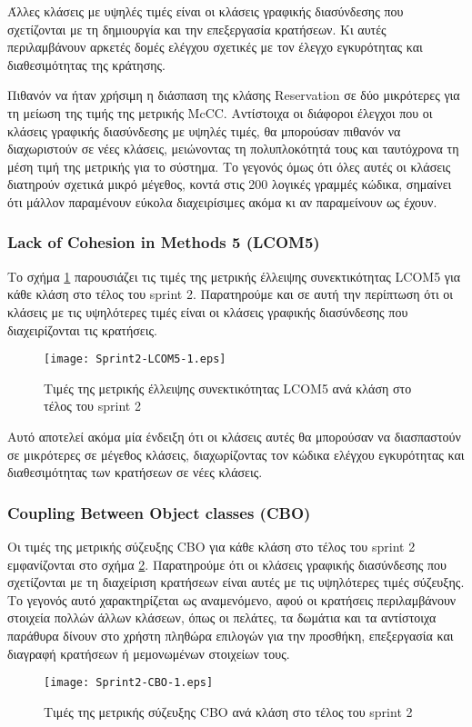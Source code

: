Άλλες κλάσεις με υψηλές τιμές είναι οι κλάσεις γραφικής διασύνδεσης που
σχετίζονται με τη δημιουργία και την επεξεργασία κρατήσεων. Κι αυτές
περιλαμβάνουν αρκετές δομές ελέγχου σχετικές με τον έλεγχο εγκυρότητας
και διαθεσιμότητας της κράτησης.

Πιθανόν να ήταν χρήσιμη η διάσπαση της κλάσης Reservation σε δύο
μικρότερες
για τη μείωση της τιμής της μετρικής McCC. Αντίστοιχα οι διάφοροι
έλεγχοι που οι κλάσεις γραφικής διασύνδεσης με υψηλές τιμές, θα
μπορούσαν πιθανόν να διαχωριστούν σε νέες κλάσεις, μειώνοντας τη
πολυπλοκότητά τους και ταυτόχρονα τη μέση τιμή της μετρικής για το
σύστημα. Το γεγονός όμως ότι όλες αυτές οι κλάσεις διατηρούν σχετικά
μικρό μέγεθος, κοντά στις 200 λογικές γραμμές κώδικα, σημαίνει ότι
μάλλον παραμένουν εύκολα διαχειρίσιμες ακόμα κι αν παραμείνουν ως έχουν.

\subsubsection{Lack of Cohesion in Methods 5 (LCOM5)}
\label{section:sprint2LCOM5}

Το σχήμα \ref{fig:sprint2LCOM5} παρουσιάζει τις τιμές της μετρικής
έλλειψης συνεκτικότητας LCOM5 για κάθε κλάση στο τέλος του sprint 2.
Παρατηρούμε και σε αυτή την περίπτωση ότι οι κλάσεις με τις υψηλότερες
τιμές είναι οι κλάσεις γραφικής διασύνδεσης που διαχειρίζονται τις
κρατήσεις.

\begin{figure}
\centering
\texttt{[image: Sprint2-LCOM5-1.eps]}
\caption{Τιμές της μετρικής έλλειψης συνεκτικότητας LCOM5 ανά κλάση στο τέλος του sprint 2}
\label{fig:sprint2LCOM5}
\end{figure}

Αυτό αποτελεί ακόμα μία ένδειξη ότι οι κλάσεις αυτές θα
μπορούσαν να διασπαστούν σε μικρότερες σε μέγεθος κλάσεις, διαχωρίζοντας
τον κώδικα ελέγχου εγκυρότητας και διαθεσιμότητας των κρατήσεων σε
νέες κλάσεις.

\subsubsection{Coupling Between Object classes (CBO)}
\label{section:sprint2CBO}

Οι τιμές της μετρικής σύζευξης CBO για κάθε κλάση στο τέλος του sprint 2
εμφανίζονται στο σχήμα \ref{fig:sprint2CBO}. Παρατηρούμε ότι οι κλάσεις
γραφικής διασύνδεσης που σχετίζονται με τη διαχείριση κρατήσεων είναι
αυτές με τις υψηλότερες τιμές σύζευξης. Το γεγονός αυτό χαρακτηρίζεται
ως αναμενόμενο, αφού οι κρατήσεις περιλαμβάνουν στοιχεία πολλών άλλων
κλάσεων, όπως οι πελάτες, τα δωμάτια και τα αντίστοιχα παράθυρα δίνουν
στο χρήστη πληθώρα επιλογών για την προσθήκη, επεξεργασία και διαγραφή
κρατήσεων ή μεμονωμένων στοιχείων τους.

\begin{figure}
\centering
\texttt{[image: Sprint2-CBO-1.eps]}
\caption{Τιμές της μετρικής σύζευξης CBO ανά κλάση στο τέλος του sprint 2}
\label{fig:sprint2CBO}
\end{figure}
